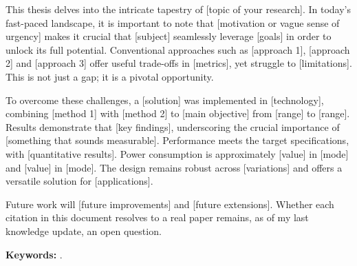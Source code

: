
This thesis delves into the intricate tapestry of [topic of your
research]. In today's fast-paced landscape, it is important to note that
[motivation or vague sense of urgency] makes it crucial that [subject]
seamlessly leverage [goals] in order to unlock its full potential.
Conventional approaches such as [approach 1], [approach 2] and
[approach 3] offer useful trade-offs in [metrics], yet struggle to
[limitations]. This is not just a gap; it is a pivotal opportunity.

To overcome these challenges, a [solution] was implemented in
[technology], combining [method 1] with [method 2] to [main objective]
from [range] to [range]. Results demonstrate that [key findings],
underscoring the crucial importance of [something that sounds
measurable]. Performance meets the target specifications, with
[quantitative results]. Power consumption is approximately [value] in
[mode] and [value] in [mode]. The design remains robust across
[variations] and offers a versatile solution for [applications].

Future work will [future improvements] and [future extensions]. Whether
each citation in this document resolves to a real paper remains, as of
my last knowledge update, an open question.

\medskip
\noindent\textbf{Keywords:} \thesiskeywords.
